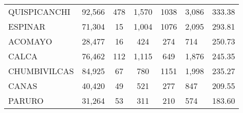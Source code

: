 \begin{tabular}{lrccclr}
	\cellcolor[HTML]{FFE699}QUISPICANCHI                           & 92,566                                                         & 478                                                         & 1,570                & 1038                     & 3,086                                                               & 333.38                                                                       \\
	\cellcolor[HTML]{FFE699}ESPINAR                                & 71,304                                                         & 15                                                          & 1,004                & 1076                     & 2,095                                                               & 293.81                                                                       \\
	\cellcolor[HTML]{FFE699}ACOMAYO                                & 28,477                                                         & 16                                                          & 424                  & 274                      & 714                                                                 & 250.73                                                                       \\
	\cellcolor[HTML]{FFE699}CALCA                                  & 76,462                                                         & 112                                                         & 1,115                & 649                      & 1,876                                                               & 245.35                                                                       \\
	\cellcolor[HTML]{FFE699}CHUMBIVILCAS                           & 84,925                                                         & 67                                                          & 780                  & 1151                     & 1,998                                                               & 235.27                                                                       \\
	\cellcolor[HTML]{C6E0B4}CANAS                                  & 40,420                                                         & 49                                                          & 521                  & 277                      & 847                                                                 & 209.55                                                                       \\
	\cellcolor[HTML]{C6E0B4}PARURO                                 & 31,264                                                         & 53                                                          & 311                  & 210                      & 574                                                                 & 183.60                                                                       \\

\end{tabular}
